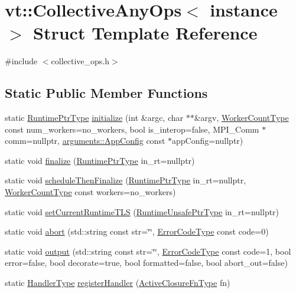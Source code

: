 \hypertarget{structvt_1_1_collective_any_ops}{}\section{vt\+:\+:Collective\+Any\+Ops$<$ instance $>$ Struct Template Reference}
\label{structvt_1_1_collective_any_ops}


{\ttfamily \#include $<$collective\+\_\+ops.\+h$>$}

\subsection*{Static Public Member Functions}
\begin{DoxyCompactItemize}
\item 
static \hyperlink{namespacevt_a0ce60e0299d8fa32223b3b9ffa0af466}{Runtime\+Ptr\+Type} \hyperlink{structvt_1_1_collective_any_ops_ae0b57c10a49875db49abc536a2a5c19c}{initialize} (int \&argc, char $\ast$$\ast$\&argv, \hyperlink{namespacevt_aa93398ea48f2cb6c188512250f7cc248}{Worker\+Count\+Type} const num\+\_\+workers=no\+\_\+workers, bool is\+\_\+interop=false, M\+P\+I\+\_\+\+Comm $\ast$comm=nullptr, \hyperlink{structvt_1_1arguments_1_1_app_config}{arguments\+::\+App\+Config} const $\ast$app\+Config=nullptr)
\item 
static void \hyperlink{structvt_1_1_collective_any_ops_ae2260154e455458fc26f02f0bce6702d}{finalize} (\hyperlink{namespacevt_a0ce60e0299d8fa32223b3b9ffa0af466}{Runtime\+Ptr\+Type} in\+\_\+rt=nullptr)
\item 
static void \hyperlink{structvt_1_1_collective_any_ops_a10be760566e5c50ce6d35ab93d7736ce}{schedule\+Then\+Finalize} (\hyperlink{namespacevt_a0ce60e0299d8fa32223b3b9ffa0af466}{Runtime\+Ptr\+Type} in\+\_\+rt=nullptr, \hyperlink{namespacevt_aa93398ea48f2cb6c188512250f7cc248}{Worker\+Count\+Type} const workers=no\+\_\+workers)
\item 
static void \hyperlink{structvt_1_1_collective_any_ops_aa86dfdc9c8ac6f25033948b5dd26fb5b}{set\+Current\+Runtime\+T\+LS} (\hyperlink{namespacevt_a8019b70cc4b9b0833c38559c85dfd53b}{Runtime\+Unsafe\+Ptr\+Type} in\+\_\+rt=nullptr)
\item 
static void \hyperlink{structvt_1_1_collective_any_ops_a31a089ab739c612171e581ead8922e8b}{abort} (std\+::string const str=\char`\"{}\char`\"{}, \hyperlink{namespacevt_a793764d753923abc3d32929870beb485}{Error\+Code\+Type} const code=0)
\item 
static void \hyperlink{structvt_1_1_collective_any_ops_a5ae4676659166ab1e1ac7334776d58c3}{output} (std\+::string const str=\char`\"{}\char`\"{}, \hyperlink{namespacevt_a793764d753923abc3d32929870beb485}{Error\+Code\+Type} const code=1, bool error=false, bool decorate=true, bool formatted=false, bool abort\+\_\+out=false)
\item 
static \hyperlink{namespacevt_af64846b57dfcaf104da3ef6967917573}{Handler\+Type} \hyperlink{structvt_1_1_collective_any_ops_a7e8425c141657c1b8286c5b56c5fd43d}{register\+Handler} (\hyperlink{namespacevt_a2a06c34cafcd511828f16cbf1476b924}{Active\+Closure\+Fn\+Type} fn)
\end{DoxyCompactItemize}


